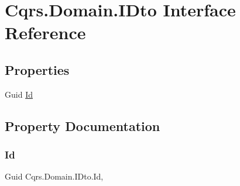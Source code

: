 \hypertarget{interfaceCqrs_1_1Domain_1_1IDto}{}\section{Cqrs.\+Domain.\+I\+Dto Interface Reference}
\label{interfaceCqrs_1_1Domain_1_1IDto}
\subsection*{Properties}
\begin{DoxyCompactItemize}
\item 
Guid \hyperlink{interfaceCqrs_1_1Domain_1_1IDto_a0314be1599b3bf36d05082be10cbca48_a0314be1599b3bf36d05082be10cbca48}{Id}
\end{DoxyCompactItemize}


\subsection{Property Documentation}
\mbox{\label{interfaceCqrs_1_1Domain_1_1IDto_a0314be1599b3bf36d05082be10cbca48_a0314be1599b3bf36d05082be10cbca48}} 
\subsubsection{\texorpdfstring{Id}{Id}}
{\footnotesize\ttfamily Guid Cqrs.\+Domain.\+I\+Dto.\+Id\hspace{0.3cm}{\ttfamily [get]}, {\ttfamily [set]}}

